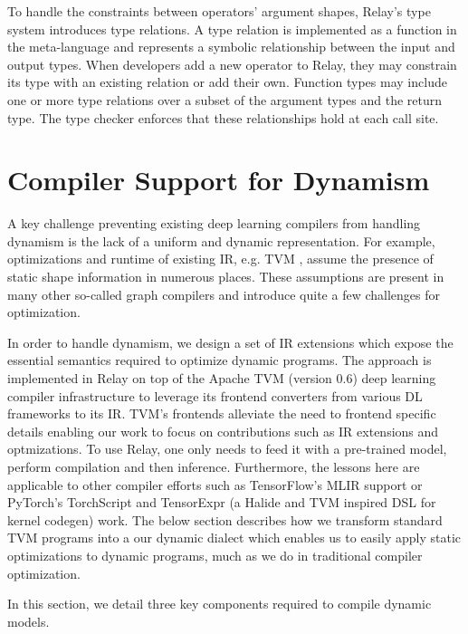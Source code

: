         To handle the constraints between operators' argument shapes, Relay's type system
          introduces type relations.
        A type relation is implemented as a function in the
          meta-language and represents a symbolic relationship between
          the input and output types.
        When developers add a new operator to Relay, they may constrain its
          type with an existing relation or add their own.
        Function types may include
          one or more type relations over a subset of the argument types and the return type.
        The type checker enforces that these relationships hold at each call site.


        \section{Compiler Support for Dynamism}
        \label{sec:Relay-compliation}

        A key challenge preventing existing deep learning compilers from handling dynamism is the lack of a uniform and dynamic representation. For example, optimizations and runtime of existing IR, e.g. TVM \citep{tvm_osdi18}, assume the presence of static shape information in numerous places. These assumptions are present in many other so-called graph compilers and introduce quite a few challenges for optimization.

        In order to handle dynamism, we design a set of IR extensions which expose the essential semantics required to optimize dynamic programs. The approach is implemented in Relay on top of the Apache TVM (version 0.6) deep learning compiler infrastructure \citep{tvm_osdi18} to leverage its frontend converters from various DL frameworks to its IR. TVM's frontends alleviate the need to frontend specific details enabling our work to focus on contributions such as IR extensions and optmizations. To use Relay, one only needs to feed it with a pre-trained model, perform compilation and then inference. Furthermore, the lessons
        here are applicable to other compiler efforts such as TensorFlow's MLIR support or PyTorch's TorchScript and TensorExpr (a Halide and TVM inspired DSL for kernel codegen) work. The below section
        describes how we transform standard TVM programs into a our dynamic dialect which enables us to easily apply static optimizations to dynamic programs, much as we do in traditional compiler optimization.

        In this section, we detail three key components required to compile dynamic models.

